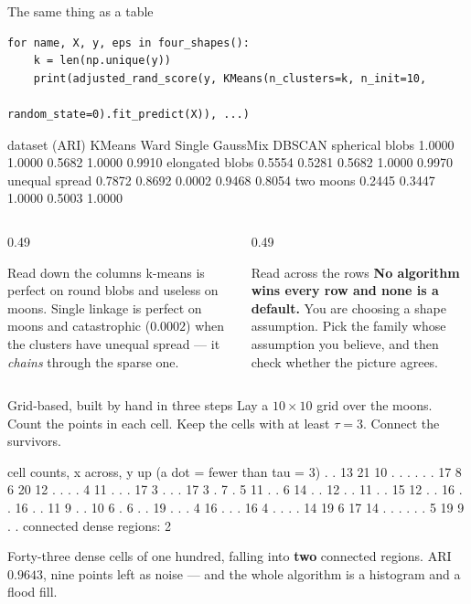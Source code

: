 \documentclass[aspectratio=169]{beamer}
\begin{document}
\begin{frame}[fragile,shrink=10]{The same thing as a table}
\begin{lstlisting}
for name, X, y, eps in four_shapes():
    k = len(np.unique(y))
    print(adjusted_rand_score(y, KMeans(n_clusters=k, n_init=10,
                                        random_state=0).fit_predict(X)), ...)
\end{lstlisting}
\begin{outblk}
dataset (ARI)        KMeans      Ward    Single  GaussMix    DBSCAN
spherical blobs      1.0000    1.0000    0.5682    1.0000    0.9910
elongated blobs      0.5554    0.5281    0.5682    1.0000    0.9970
unequal spread       0.7872    0.8692    0.0002    0.9468    0.8054
two moons            0.2445    0.3447    1.0000    0.5003    1.0000
\end{outblk}
  \begin{columns}[T]
    \begin{column}{0.49\textwidth}
      \begin{block}{Read down the columns}
        k-means is perfect on round blobs and useless on moons. Single
        linkage is perfect on moons and catastrophic ($0.0002$) when the
        clusters have unequal spread --- it \emph{chains} through the sparse
        one.
      \end{block}
    \end{column}
    \begin{column}{0.49\textwidth}
      \begin{alertblock}{Read across the rows}
        \textbf{No algorithm wins every row and none is a default.} You are
        choosing a shape assumption. Pick the family whose assumption you
        believe, and then check whether the picture agrees.
      \end{alertblock}
    \end{column}
  \end{columns}
\end{frame}

\begin{frame}[fragile,shrink=10]{Grid-based, built by hand in three steps}
  Lay a $10 \times 10$ grid over the moons. Count the points in each cell.
  Keep the cells with at least $\tau = 3$. Connect the survivors.
\begin{outblk}
cell counts, x across, y up (a dot = fewer than tau = 3)
      .   .  13  21  10   .   .   .   .   .
      .  17   8   6  20  12   .   .   .   .
      4  11   .   .   .  17   3   .   .   .
     17   3   .   7   .   5  11   .   .   6
     14   .   .  12   .   .  11   .   .  15
     12   .   .  16   .   .  16   .   .  11
      9   .   .  10   6   .   6   .   .  19
      .   .   .   4  16   .   .   .  16   4
      .   .   .   .  14  19   6  17  14   .
      .   .   .   .   .   5  19   9   .   .
connected dense regions: 2
\end{outblk}
  \begin{center}\small
    Forty-three dense cells of one hundred, falling into
    \textbf{two} connected regions. ARI $\mathbf{0.9643}$, nine points left
    as noise --- and the whole algorithm is a histogram and a flood fill.
  \end{center}
\end{frame}
\end{document}
